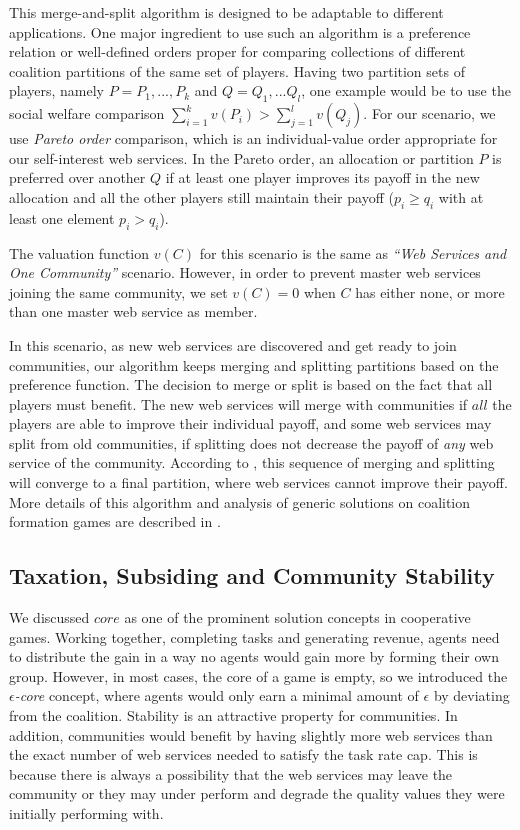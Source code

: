 This merge-and-split algorithm is designed to be adaptable to
different applications. One major ingredient to use such an
algorithm is a preference relation or well-defined orders proper
for comparing collections of different coalition partitions of the
same set of players. Having two partition sets of players, namely
$P = {P_1,...,P_k}$ and $Q = {Q_1,...Q_l}$, one example would be
to use the social welfare comparison $\sum^k_{i=1}v(P_i) >
\sum^l_{j=1}v(Q_j)$. For our scenario, we use \emph{Pareto order}
comparison, which is an individual-value order appropriate for our
self-interest web services. In the Pareto order, an allocation or
partition $P$ is preferred over another $Q$ if at least one player
improves its payoff in the new allocation and all the other
players still maintain their payoff ($p_i \geq q_i$ with at least
one element $p_i > q_i$).

The valuation function $v(C)$ for this scenario is the same as
\emph{``Web Services and One Community''} scenario. However, in
order to prevent master web services joining the same community,
we set $v(C) = 0$ when $C$ has either none, or more than one
master web service as member.

In this scenario, as new web services are discovered and get ready
to join communities, our algorithm keeps merging and splitting
partitions based on the preference function. The decision to merge
or split is based on the fact that all players must benefit. The
new web services will merge with communities if $all$ the players
are able to improve their individual payoff, and some web services
may split from old communities, if splitting does not decrease the
payoff of \emph{any} web service of the community. According to
\cite{DBLP:journals/corr/abs-cs-0605132}, this sequence of merging
and splitting will converge to a final partition, where web
services cannot improve their payoff. More details of this
algorithm and analysis of generic solutions on coalition formation
games are described in \cite{DBLP:journals/igtr/AptW09}.

\subsection{Taxation, Subsiding and Community Stability}\label{s:tax}

We discussed $core$ as one of the prominent solution concepts in
cooperative games. Working together, completing tasks and
generating revenue, agents need to distribute the gain in a way no
agents would gain more by forming their own group. However, in
most cases, the core of a game is empty, so we introduced the
\emph{$\epsilon$-core} concept, where agents would only earn a
minimal amount of $\epsilon$ by deviating from the coalition.
Stability is an attractive property for communities. In addition,
communities would benefit by having slightly more web services
than the exact number of web services needed to satisfy the task
rate cap. This is because there is always a possibility that the
web services may leave the community or they may under perform and
degrade the quality values they were initially performing with.

